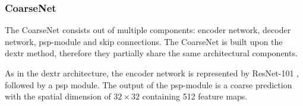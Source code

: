 \subsubsection{CoarseNet}
The CoarseNet consists out of multiple components: encoder network, decoder network, \gls{psp}-module and skip connections. The CoarseNet is built upon the \gls{dextr} method, therefore they partially share the same architectural components.

As in the \gls{dextr} architecture, the encoder network is represented by ResNet-101 \cite{He16-ResNet}, followed by a \gls{psp} module.
The output of the \gls{psp}-module is a coarse prediction with the spatial dimension of  $32 \times 32$  containing 512 feature maps. 


